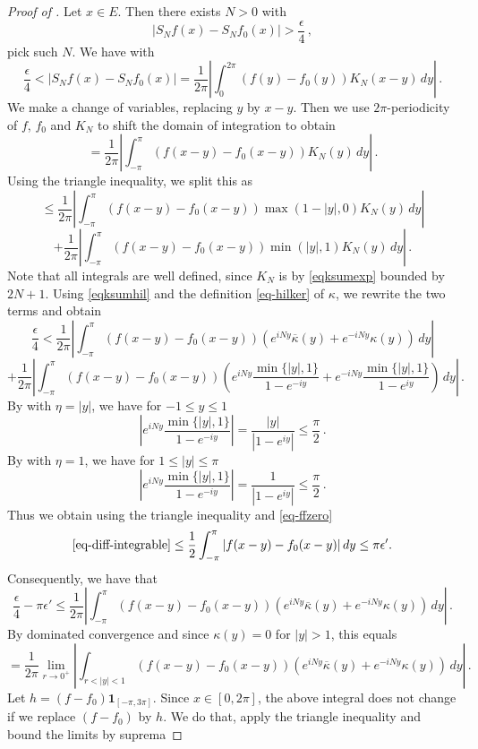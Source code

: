 \begin{proof}[Proof of ]
Let $x \in E$. Then there exists $N > 0$ with
$$
    |S_N f(x) - S_N f_0(x)| > \frac{\epsilon}{4}\,,
$$
pick such $N$. We have with 
$$
    \frac{\epsilon}{4} < |S_N f(x) - S_N f_0(x)| = \frac{1}{2\pi} \left| \int_0^{2\pi} (f(y) - f_0(y)) K_N(x-y) \, dy\right|\,.
$$
We make a change of variables, replacing $y$ by $x -y$. Then we use $2\pi$-periodicity of $f$, $f_0$ and $K_N$ to shift the domain of integration to obtain
$$
    = \frac{1}{2\pi} \left|\int_{-\pi}^{\pi} (f(x-y) - f_0(x-y)) K_N(y) \, dy\right|\,.
$$
Using the triangle inequality, we split this as
$$
    \le \frac{1}{2\pi} \left|\int_{-\pi}^{\pi} (f(x-y) - f_0(x-y)) \max(1 - |y|, 0) K_N(y) \, dy\right|
$$
$$
    + \frac{1}{2\pi} \left|\int_{-\pi}^{\pi} (f(x-y) - f_0(x-y)) \min(|y|, 1) K_N(y) \, dy\right|\,.
$$
Note that all integrals are well defined, since $K_N$ is by \eqref{eqksumexp} bounded by $2N+1$.
Using \eqref{eqksumhil} and the definition \eqref{eq-hilker} of $\kappa$, we rewrite the two terms and obtain
\begin{equation}
    \label{eq-diff-singular}
    \frac{\epsilon}{4} < \frac{1}{2\pi} \left| \int_{-\pi}^{\pi} (f(x-y) - f_0(x-y)) (e^{iNy} \overline{\kappa}(y) + e^{-iNy}\kappa(y)) \, dy\right|
\end{equation}
\begin{equation}
    \label{eq-diff-integrable}
    + \frac{1}{2\pi} \left|\int_{-\pi}^{\pi} (f(x-y) - f_0(x-y)) ( e^{iNy} \frac{\min\{|y|, 1\} }{1 - e^{-iy}} + e^{-iNy} \frac{\min\{|y|, 1\} }{1 - e^{iy}}) \, dy \right|\,.
\end{equation}
By  with $\eta = |y|$, we have for $-1 \le y \le 1$
$$
    |e^{iNy}\frac{\min\{|y|, 1\} }{1 - e^{-iy}}| = \frac{|y|}{|1 - e^{iy}|} \le \frac \pi 2 \,.
$$
By  with $\eta = 1$, we have for $1 \le |y| \le \pi$
$$
    |e^{iNy}\frac{\min\{|y|, 1\} }{1 - e^{-iy}}| = \frac{1}{|1 - e^{iy}|} \le \frac \pi 2 \,.
$$
Thus we obtain using the triangle inequality and \eqref{eq-ffzero}
$$
    \eqref{eq-diff-integrable} \le \frac{1}{2} \int_{-\pi}^{\pi} |f(x-y) - f_0(x-y)| \, dy \le \pi\epsilon'.
$$
Consequently, we have that
$$
    \frac{\epsilon}{4} - \pi\epsilon' \le \frac{1}{2\pi} \left| \int_{-\pi}^{\pi} (f(x-y) - f_0(x-y)) (e^{iNy} \overline{\kappa}(y) + e^{-iNy}\kappa(y)) \, dy\right|\,.
$$
By dominated convergence and since $\kappa(y) = 0$ for $|y| > 1$, this equals
$$
     = \frac{1}{2\pi} \lim_{r \to 0^+} \left| \int_{r < |y| < 1} (f(x-y) - f_0(x-y)) (e^{iNy} \overline{\kappa}(y) + e^{-iNy}\kappa(y)) \, dy\right|\,.
$$
Let $h = (f - f_0) \mathbf{1}_{[-\pi, 3\pi]}$. Since $x \in [0, 2\pi]$, the above integral does not change if we replace $(f - f_0)$ by $h$. We do that, apply the triangle inequality and bound the limits by suprema

\end{proof}
